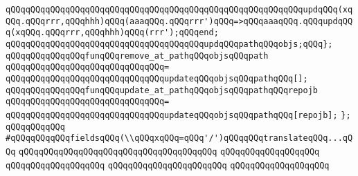 \verb|qQQqqQQqqQQqqQQqqQQqqQQqqQQqqQQqqQQqqQQqqQQqqQQqqQQqqQQqqQQqupdqQQq(xqQQq.qQQqrrr,qQQqhhh)qQQq(aaaqQQq.qQQqrrr')qQQq=>qQQqaaaqQQq.qQQqupdqQQq(xqQQq.qQQqrrr,qQQqhhh)qQQq(rrr');qQQqend;|\newline
\newline
\verb|qQQqqQQqqQQqqQQqqQQqqQQqqQQqqQQqqQQqqQQqupdqQQqpathqQQqobjs;qQQq};|\newline
\newline
\newline
\verb|qQQqqQQqqQQqqQQqfunqQQqremove_at_pathqQQqobjsqQQqpath|\newline
\verb|qQQqqQQqqQQqqQQqqQQqqQQqqQQqqQQq=|\newline
\verb|qQQqqQQqqQQqqQQqqQQqqQQqqQQqqQQqupdateqQQqobjsqQQqpathqQQq[];|\newline
\newline
\verb|qQQqqQQqqQQqqQQqfunqQQqupdate_at_pathqQQqobjsqQQqpathqQQqrepojb|\newline
\verb|qQQqqQQqqQQqqQQqqQQqqQQqqQQqqQQq=|\newline
\verb|qQQqqQQqqQQqqQQqqQQqqQQqqQQqqQQqupdateqQQqobjsqQQqpathqQQq[repojb];|\newline
\newline
\verb|};|\newline
\verb|qQQqqQQqqQQq|\newline
\verb|#qQQqqQQqqQQqfieldsqQQq(\\qQQqxqQQq=qQQq'/')qQQqqQQqtranslateqQQq...qQQq|\newline
\verb|qQQqqQQqqQQqqQQqqQQqqQQqqQQqqQQqqQQqqQQq|\newline
\verb|qQQqqQQqqQQqqQQqqQQq|\newline
\newline
\verb|qQQqqQQqqQQqqQQqqQQq|\newline
\newline
\verb|qQQqqQQqqQQqqQQqqQQqqQQq|\newline
\verb|qQQqqQQqqQQqqQQqqQQq|\newline

